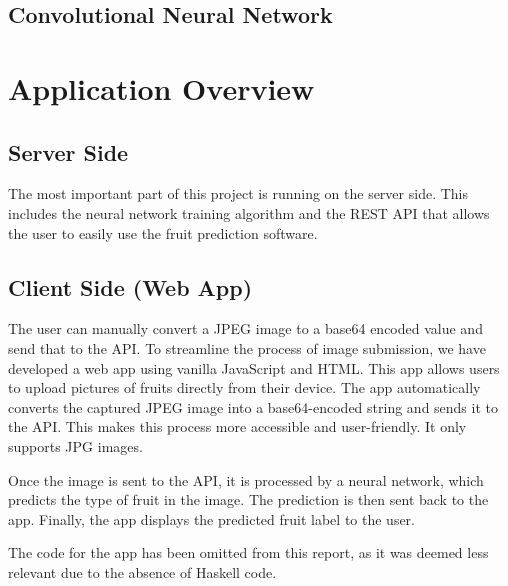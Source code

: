 \documentclass[12pt,a4paper]{article}
\begin{document}
\subsection{Convolutional Neural Network}





\section{Application Overview}

\subsection{Server Side}
The most important part of this project is running on the server side. This includes the neural network training algorithm and the REST API that allows the user to easily use the fruit prediction software.

\subsection{Client Side (Web App)}
The user can manually convert a JPEG image to a base64 encoded value and send that to the API.
To streamline the process of image submission, we have developed a web app using vanilla JavaScript and HTML. This app allows users to upload pictures of fruits directly from their device. The app automatically converts the captured JPEG image into a base64-encoded string and sends it to the API. This makes this process more accessible and user-friendly. It only supports JPG images.

Once the image is sent to the API, it is processed by a neural network, which predicts the type of fruit in the image. The prediction is then sent back to the app. Finally, the app displays the predicted fruit label to the user.

The code for the app has been omitted from this report, as it was deemed less relevant due to the absence of Haskell code.







\end{document}

